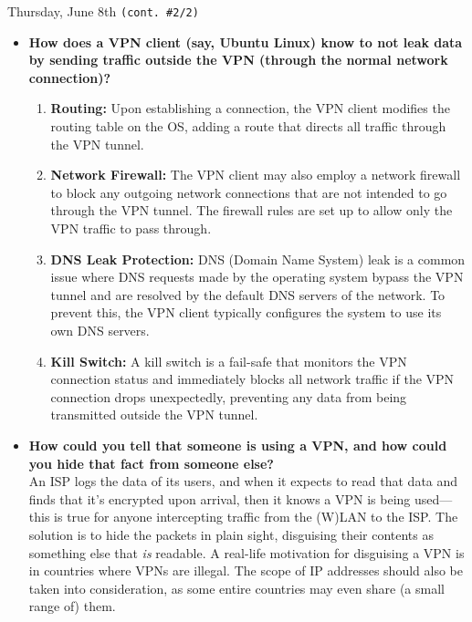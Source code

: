 \documentclass[11pt]{article}
\begin{document}
\begin{orangebox}{Thursday, June 8th \hspace{0.2cm}\texttt{(cont. \#2/2)}\vspace{-2.2em}\begin{flushright}\end{flushright}}
    \begin{itemize}
        \item\textbf{How does a VPN client (say, Ubuntu Linux) know to not leak data by sending traffic outside the VPN (through the normal network connection)?}
        \begin{enumerate}
            \item\textbf{Routing:} Upon establishing a connection, the VPN client modifies the routing table on the OS, adding a route that directs all traffic through the VPN tunnel.
            \item\textbf{Network Firewall:} The VPN client may also employ a network firewall to block any outgoing network connections that are not intended to go through the VPN tunnel. The firewall rules are set up to allow only the VPN traffic to pass through.
            \item\textbf{DNS Leak Protection:} DNS (Domain Name System) leak is a common issue where DNS requests made by the operating system bypass the VPN tunnel and are resolved by the default DNS servers of the network. To prevent this, the VPN client typically configures the system to use its own DNS servers.
            \item\textbf{Kill Switch:} A kill switch is a fail-safe that monitors the VPN connection status and immediately blocks all network traffic if the VPN connection drops unexpectedly, preventing any data from being transmitted outside the VPN tunnel.
        \end{enumerate}
        \item\textbf{How could you tell that someone is using a VPN, and how could you hide that fact from someone else?} \\
        \phantom{~~~~} An ISP logs the data of its users, and when it expects to read that data and finds that it's encrypted upon arrival, then it knows a VPN is being used---this is true for anyone intercepting traffic from the (W)LAN to the ISP. The solution is to hide the packets in plain sight, disguising their contents as something else that \textit{is} readable. A real-life motivation for disguising a VPN is in countries where VPNs are illegal. The scope of IP addresses should also be taken into consideration, as some entire countries may even share (a small range of) them.

\end{itemize}
\end{orangebox}
\end{document}
